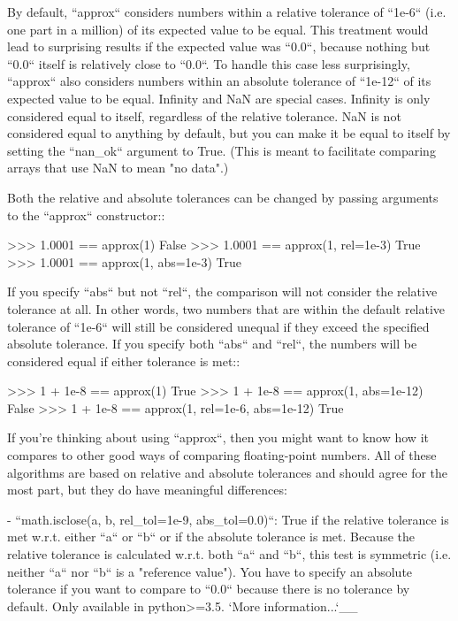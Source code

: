 \begin{DoxyVerb}
By default, ``approx`` considers numbers within a relative tolerance of
``1e-6`` (i.e. one part in a million) of its expected value to be equal.
This treatment would lead to surprising results if the expected value was
``0.0``, because nothing but ``0.0`` itself is relatively close to ``0.0``.
To handle this case less surprisingly, ``approx`` also considers numbers
within an absolute tolerance of ``1e-12`` of its expected value to be
equal.  Infinity and NaN are special cases.  Infinity is only considered
equal to itself, regardless of the relative tolerance.  NaN is not
considered equal to anything by default, but you can make it be equal to
itself by setting the ``nan_ok`` argument to True.  (This is meant to
facilitate comparing arrays that use NaN to mean "no data".)

Both the relative and absolute tolerances can be changed by passing
arguments to the ``approx`` constructor::

    >>> 1.0001 == approx(1)
    False
    >>> 1.0001 == approx(1, rel=1e-3)
    True
    >>> 1.0001 == approx(1, abs=1e-3)
    True

If you specify ``abs`` but not ``rel``, the comparison will not consider
the relative tolerance at all.  In other words, two numbers that are within
the default relative tolerance of ``1e-6`` will still be considered unequal
if they exceed the specified absolute tolerance.  If you specify both
``abs`` and ``rel``, the numbers will be considered equal if either
tolerance is met::

    >>> 1 + 1e-8 == approx(1)
    True
    >>> 1 + 1e-8 == approx(1, abs=1e-12)
    False
    >>> 1 + 1e-8 == approx(1, rel=1e-6, abs=1e-12)
    True

If you're thinking about using ``approx``, then you might want to know how
it compares to other good ways of comparing floating-point numbers.  All of
these algorithms are based on relative and absolute tolerances and should
agree for the most part, but they do have meaningful differences:

- ``math.isclose(a, b, rel_tol=1e-9, abs_tol=0.0)``:  True if the relative
  tolerance is met w.r.t. either ``a`` or ``b`` or if the absolute
  tolerance is met.  Because the relative tolerance is calculated w.r.t.
  both ``a`` and ``b``, this test is symmetric (i.e.  neither ``a`` nor
  ``b`` is a "reference value").  You have to specify an absolute tolerance
  if you want to compare to ``0.0`` because there is no tolerance by
  default.  Only available in python>=3.5.  `More information...`__


\end{DoxyVerb}
